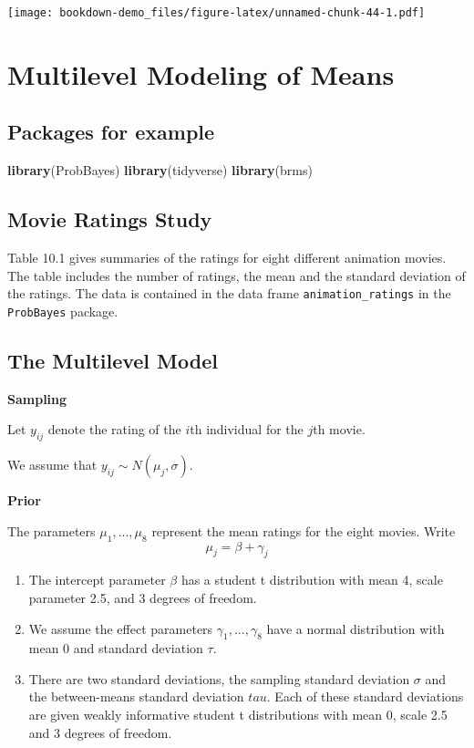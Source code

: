 \documentclass[
]{book}
\newenvironment{Shaded}{\begin{snugshade}}{\end{snugshade}}
\newcommand{\KeywordTok}[1]{\textcolor[rgb]{0.13,0.29,0.53}{\textbf{#1}}}
\newcommand{\NormalTok}[1]{#1}
\begin{document}
\texttt{[image: bookdown-demo\_files/figure-latex/unnamed-chunk-44-1.pdf]}

\hypertarget{multilevel-modeling-of-means}{%
\chapter{Multilevel Modeling of Means}\label{multilevel-modeling-of-means}}

\hypertarget{packages-for-example}{%
\section{Packages for example}\label{packages-for-example}}

\begin{Shaded}
\begin{Highlighting}[]
\KeywordTok{library}\NormalTok{(ProbBayes)}
\KeywordTok{library}\NormalTok{(tidyverse)}
\KeywordTok{library}\NormalTok{(brms)}
\end{Highlighting}
\end{Shaded}

\hypertarget{movie-ratings-study}{%
\section{Movie Ratings Study}\label{movie-ratings-study}}

Table 10.1 gives summaries of the ratings for eight different animation movies. The table includes the number of ratings, the mean and the standard deviation of the ratings. The data is contained in the data frame \texttt{animation\_ratings} in the \texttt{ProbBayes} package.

\hypertarget{the-multilevel-model}{%
\section{The Multilevel Model}\label{the-multilevel-model}}

\textbf{Sampling}

Let \(y_{ij}\) denote the rating of the \(i\)th individual for the \(j\)th movie.

We assume that \(y_{ij} \sim N(\mu_j, \sigma)\).

\textbf{Prior}

The parameters \(\mu_1, ..., \mu_8\) represent the mean ratings for the eight movies. Write
\[
\mu_j = \beta + \gamma_j
\]

\begin{enumerate}
\def\labelenumi{\arabic{enumi}.}
\item
  The intercept parameter \(\beta\) has a student t distribution with mean 4, scale parameter 2.5, and 3 degrees of freedom.
\item
  We assume the effect parameters \(\gamma_1, ..., \gamma_8\) have a normal distribution with mean 0 and standard deviation \(\tau\).
\item
  There are two standard deviations, the sampling standard deviation \(\sigma\) and the between-means standard deviation \(tau\). Each of these standard deviations are given weakly informative student t distributions with mean 0, scale 2.5 and 3 degrees of freedom.
\end{enumerate}
\end{document}
